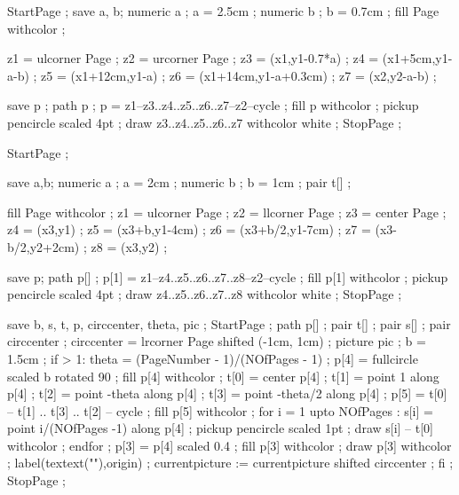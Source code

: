 \setupcolors[textcolor=simpleslides:textcolor]


StartPage ;
save a, b;
numeric a ; a = 2.5cm ;
numeric b ; b = 0.7cm ;
fill Page withcolor  ;

z1 = ulcorner Page ;
z2 = urcorner Page ;
z3 = (x1,y1-0.7*a) ;
z4 = (x1+5cm,y1-a-b) ;
z5 = (x1+12cm,y1-a) ;
z6 = (x1+14cm,y1-a+0.3cm) ;
z7 = (x2,y2-a-b) ;

save p ;
path p ;
p = z1--z3..z4..z5..z6..z7--z2--cycle ;
fill p withcolor  ;
pickup pencircle scaled 4pt ;
draw z3..z4..z5..z6..z7 withcolor white ;
StopPage ;
\stopuniqueMPgraphic 

StartPage ;

save a,b;
numeric a ; a = 2cm ;
numeric b ; b = 1cm ;
pair  t[] ;

fill Page withcolor  ;
z1 = ulcorner Page ;
z2 = llcorner Page ;
z3 = center Page ;
z4 = (x3,y1) ;
z5 = (x3+b,y1-4cm) ;
z6 = (x3+b/2,y1-7cm) ;
z7 = (x3-b/2,y2+2cm) ;
z8 = (x3,y2) ;

save p;
path p[] ;
p[1] = z1--z4..z5..z6..z7..z8--z2--cycle ;
fill p[1] withcolor  ;
pickup pencircle scaled 4pt ;
draw z4..z5..z6..z7..z8 withcolor white ;
StopPage ;
\stopuniqueMPgraphic 

save b, s, t, p, circcenter, theta, pic ;
StartPage ;
path p[] ;
pair t[] ;
pair s[] ;
pair circcenter ; circcenter = lrcorner Page shifted (-1cm, 1cm) ;
picture pic ;
b = 1.5cm ;
if \realfolio > 1:
	theta = (PageNumber - 1)/(NOfPages - 1) ;
	p[4] = fullcircle scaled b rotated 90 ;
	fill p[4] withcolor   ;
	t[0] = center p[4] ;
	t[1] = point 1 along p[4] ;
	t[2] = point -theta along p[4] ;
	t[3] = point -theta/2 along p[4] ;
	p[5] = t[0] -- t[1] .. t[3] .. t[2] -- cycle ;
	fill p[5] withcolor  ;
	for i = 1 upto NOfPages :
		s[i] = point i/(NOfPages -1) along p[4] ;
		pickup pencircle scaled 1pt ;
		draw s[i] -- t[0] withcolor  ;
	endfor ;
	p[3] = p[4] scaled 0.4 ;
	fill p[3] withcolor  ;
	draw p[3] withcolor  ;
	label(textext("\switchtobodyfont[10pt]\pagenumber"),origin) ;
	currentpicture := currentpicture shifted circcenter ;
fi ;
StopPage ;
\stopuseMPgraphic 

